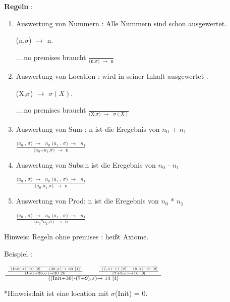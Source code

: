 \documentclass[a4paper,12pt,twoside,headsepline]{scrartcl}
\begin{document}
\textbf{Regeln} :\begin{enumerate}

\item  Auswertung von Nummern : Alle Nummern sind schon ausgewertet.\label{1}
\begin{center}
(n,$\sigma$) $\to$ n.    

 ....no premises braucht   $\frac{ } {\text{(n,$\sigma$) $\to$ n}}$
\end{center}  
\item Auswertung von Location : wird in seiner Inhalt ausgewertet .\label{2}

\begin{center}
	(X,$\sigma$) $\to$ $\sigma(X)$.    
	
	....no premises braucht    $\frac{ } {\text{(X,$\sigma$) $\to$ $\sigma(X)$}}$
\end{center} 

\item \label{3} Auswertung von Sum :  n ist die Eregebnis von $n_0$ + $n_1$

\begin{center}
	 $\frac  {\text {($a_0$ , $\sigma$) $\to$ $n_0$   ($a_1$ , $\sigma$) $\to$ $n_1$} } { \text{($a_0$+$a_1$,$\sigma$) $\to$ n} }$ 
\end{center}

\item  \label{4} Auswertung von Subs:n ist die Eregebnis von $n_0$ - $n_1$

\begin{center}
	$\frac  {\text {($a_0$ , $\sigma$) $\to$ $n_0$   ($a_1$ , $\sigma$) $\to$ $n_1$} } { \text{($a_0$-$a_1$,$\sigma$) $\to$ n} }$
	
	\end{center}

\item  \label{5} Auswertung von Prod: n ist die Eregebnis von $n_0$ * $n_1$

\begin{center}
	$\frac  {\text {($a_0$ , $\sigma$) $\to$ $n_0$   ($a_1$ , $\sigma$) $\to$ $n_1$} } { \text{($a_0$*$a_1$,$\sigma$) $\to$ n} }$
	\end{center}

\end{enumerate}   
Hinweis: Regeln ohne premises : heißt Axiome. 



Beispiel : 
\begin{center}
	$\frac{  \text{  $\frac { \text {$\frac  {}  {\text{ (Init,$\sigma$)$\to$0 $\ref{2}$ $\quad$          (30,$\sigma$)$\to$ 30 $\ref{1}$ }}$}   } {\text{(Init+30,$\sigma$)$\to$30  $\ref{3}$}}$ $\qquad$   $\frac { \text {$\frac  {}  {\text{ (7,$\sigma$)$\to$7 $ $\ref{2}$\quad$           (9,$\sigma$)$\to$9 $\ref{2}$}}$}} {\text{(7+9,$\sigma$)$\to$16 $\ref{3}$}}$  }} {\text{((Init+30)-(7+9),$\sigma$)$\to$ 14 $\ref{4}$}}$
	
	*Hinweis:Init ist eine location mit $\sigma$(Init) = 0. 
\end{center}
                     
\end{document}
